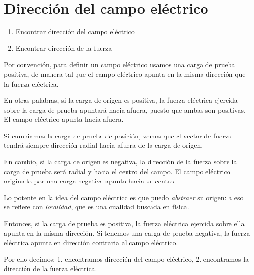 \section{Dirección del campo eléctrico}

\begin{enumerate}
    \item Encontrar dirección del campo eléctrico
    \item Encontrar dirección de la fuerza
\end{enumerate}

Por convención,
para definir un campo eléctrico usamos una carga de prueba positiva,
de manera tal que el campo eléctrico apunta 
en la misma dirección que la fuerza eléctrica.

En otras palabras,
si la carga de origen es positiva,
la fuerza eléctrica ejercida sobre la carga de prueba apuntará hacia afuera,
puesto que ambas son positivas.
El campo eléctrico apunta hacia afuera.

Si cambiamos la carga de prueba de posición,
vemos que el vector de fuerza tendrá siempre dirección radial hacia afuera 
de la carga de origen.

En cambio,
si la carga de origen es negativa,
la dirección de la fuerza sobre la carga de prueba será radial 
y hacia el centro del campo.
El campo eléctrico originado por una carga negativa apunta hacia su centro.

Lo potente en la idea del campo eléctrico es que puedo 
\textit{abstraer} su origen:
a eso se refiere con \textit{localidad},
que es una cualidad buscada en física.

Entonces,
si la carga de prueba es positiva,
la fuerza eléctrica ejercida sobre ella apunta en la misma dirección.
Si tenemos una carga de prueba negativa,
la fuerza eléctrica apunta en dirección contraria al campo eléctrico.

Por ello decimos:
1. encontramos dirección del campo eléctrico,
2. encontramos la dirección de la fuerza eléctrica.
